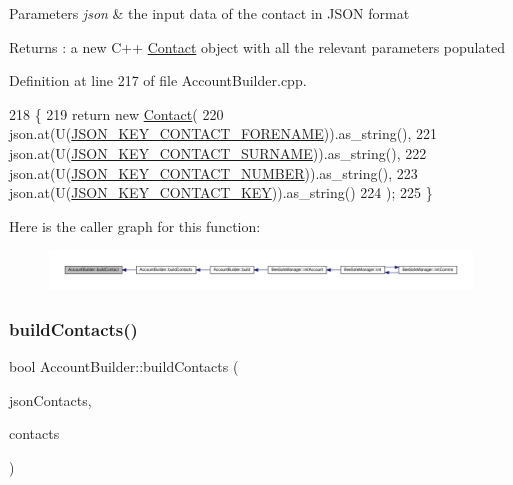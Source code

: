 \begin{DoxyParams}{Parameters}
{\em json} & the input data of the contact in J\+S\+ON format \\
\hline
\end{DoxyParams}
\begin{DoxyReturn}{Returns}
\+: a new C++ \hyperlink{class_contact}{Contact} object with all the relevant parameters populated 
\end{DoxyReturn}


Definition at line 217 of file Account\+Builder.\+cpp.


\begin{DoxyCode}
218 \{
219     \textcolor{keywordflow}{return} \textcolor{keyword}{new} \hyperlink{class_contact}{Contact}(
220             json.at(U(\hyperlink{_contact_8h_a18b1ad44af79fea17bfed22ff66f94f8}{JSON\_KEY\_CONTACT\_FORENAME})).as\_string(),
221             json.at(U(\hyperlink{_contact_8h_a579318fe639c3cf3628817c4090be13e}{JSON\_KEY\_CONTACT\_SURNAME})).as\_string(),
222             json.at(U(\hyperlink{_contact_8h_a97dc3d327e5283642c81bc7d6a572ced}{JSON\_KEY\_CONTACT\_NUMBER})).as\_string(),
223             json.at(U(\hyperlink{_contact_8h_a90f2095b835454d47c72995503684937}{JSON\_KEY\_CONTACT\_KEY})).as\_string()
224     );
225 \}
\end{DoxyCode}
Here is the caller graph for this function\+:
\nopagebreak
\begin{figure}[H]
\begin{center}
\leavevmode
\includegraphics[width=350pt]{d9/daa/class_account_builder_a3a3cc8d8beb8af6c0a9feb79e28adb59_icgraph}
\end{center}
\end{figure}
\mbox{\label{class_account_builder_aa3af3cf2501508d76ee3f7140deeba80}} 
\subsubsection{\texorpdfstring{build\+Contacts()}{buildContacts()}}
{\footnotesize\ttfamily bool Account\+Builder\+::build\+Contacts (\begin{DoxyParamCaption}\item[{const web\+::json\+::array \&}]{json\+Contacts,  }\item[{std\+::vector$<$ \hyperlink{class_contact}{Contact} $\ast$$>$ \&}]{contacts }\end{DoxyParamCaption})\hspace{0.3cm}{\ttfamily [private]}}

